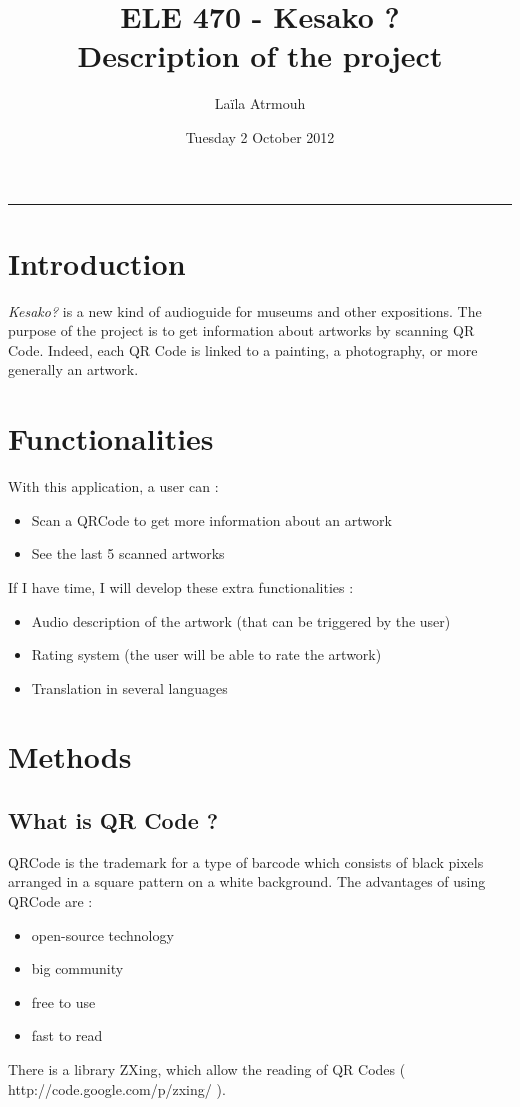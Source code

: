 \documentclass[a4paper, 12pt, final]{article}
\title{ ELE 470 - Kesako ? \\ Description of the project }
\author{ Laïla Atrmouh }
\date{Tuesday 2 October 2012}
\begin{document}
\maketitle  
   
\rule[0.5ex]{\textwidth}{0.1mm}

\section{Introduction}  
\emph{Kesako?} is a new kind of audioguide for museums and other expositions. The purpose of the project is to get information about artworks by scanning QR Code. Indeed, each QR Code is linked to a painting, a photography, or more generally an artwork. 

\section{Functionalities}
With this application, a user can :
\begin{itemize}
\item Scan a QRCode to get more information about an artwork
\item See the last 5 scanned artworks
\end {itemize}

If I have time, I will develop these extra functionalities :
\begin{itemize}
\item Audio description of the artwork (that can be triggered by the user)
\item Rating system (the user will be able to rate the artwork) 
\item Translation in several languages
\end{itemize}

\section {Methods}
\subsection{What is QR Code ?}
QRCode is the trademark for a type of barcode which consists of black pixels arranged in a square pattern on a white background. The advantages of using QRCode are :
\begin {itemize}
\item open-source technology
\item big community
\item free to use
\item fast to read
\end{itemize}  
There is a library ZXing, which allow the reading of QR Codes ( http://code.google.com/p/zxing/ ).  
\end{document}
